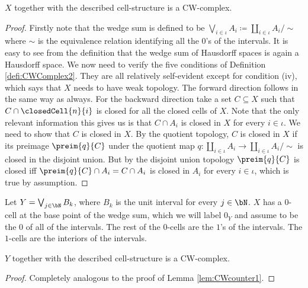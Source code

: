 \begin{lem} \label{lem:CWcounter1}
    $X$ together with the described cell-structure is a CW-complex.
\end{lem}
\begin{proof}
    Firstly note that the wedge sum is defined to be $\bigvee_{i \in \iota} A_i \coloneq \coprod_{i \in \iota} A_i / \sim$ where $\sim$ is the equivalence relation identifying all the $0$'s of the intervals. 
    It is easy to see from the definition that the wedge sum of Hausdorff spaces is again a Hausdorff space. 
    We now need to verify the five conditions of Definition \ref{defi:CWComplex2}. 
    They are all relatively self-evident except for condition (iv), which says that $X$ needs to have weak topology. 
    The forward direction follows in the same way as always. 
    For the backward direction take a set $C \subseteq X$ such that $C \cap \closedCell{n}{i}$ is closed for all the closed cells of $X$. 
    Note that the only relevant information this gives us is that $C \cap A_i$ is closed in $X$ for every $i \in \iota$.
    We need to show that $C$ is closed in $X$. 
    By the quotient topology, $C$ is closed in $X$ if its preimage $\preim{q}{C}$ under the quotient map $q \colon \coprod_{i \in \iota} A_i \to \coprod_{i \in \iota} A_i / \sim$ is closed in the disjoint union. 
    But by the disjoint union topology $\preim{q}{C}$ is closed iff $\preim{q}{C} \cap A_i = C \cap A_i$ is closed in $A_i$ for every $i \in \iota$, which is true by assumption. 
\end{proof}

\begin{defi}
    Let $Y = \bigvee_{j \in \bN}B_k$, where $B_k$ is the unit interval for every $j \in \bN$.
    $X$ has a $0$-cell at the base point of the wedge sum, which we will label $0_Y$ and assume to be the $0$ of all of the intervals. The rest of the $0$-cells are the $1$'s of the intervals. 
    The $1$-cells are the interiors of the intervals. 
\end{defi}

\begin{lem}
    $Y$ together with the described cell-structure is a CW-complex.
\end{lem}
\begin{proof}
    Completely analogous to the proof of Lemma \ref{lem:CWcounter1}.
\end{proof}

